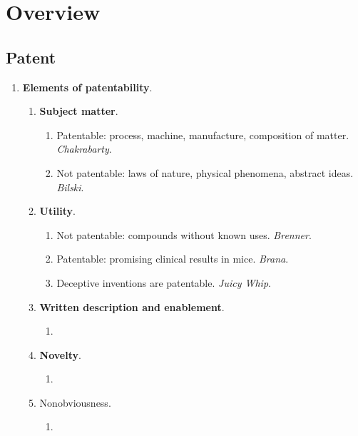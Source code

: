 \section{Overview}

\subsection{Patent}

\begin{enumerate}
    \item \textbf{Elements of patentability}.
    \begin{enumerate}
        \item \textbf{Subject matter}.
        \begin{enumerate}
            \item Patentable: process, machine, manufacture, composition of 
            matter. \emph{Chakrabarty}.
            \item Not patentable: laws of nature, physical phenomena, abstract 
            ideas. \emph{Bilski}.
        \end{enumerate}
        \item \textbf{Utility}.
        \begin{enumerate}
            \item Not patentable: compounds without known uses. 
            \emph{Brenner}.
            \item Patentable: promising clinical results in mice. 
            \emph{Brana}.
            \item Deceptive inventions are patentable. \emph{Juicy Whip}.
        \end{enumerate}
        \item \textbf{Written description and enablement}.
        \begin{enumerate}
            \item %
        \end{enumerate}
        \item \textbf{Novelty}.
        \begin{enumerate}
            \item %
        \end{enumerate}
        \item Nonobviousness.
        \begin{enumerate}
            \item %
        \end{enumerate}
    \end{enumerate}

\end{enumerate}
